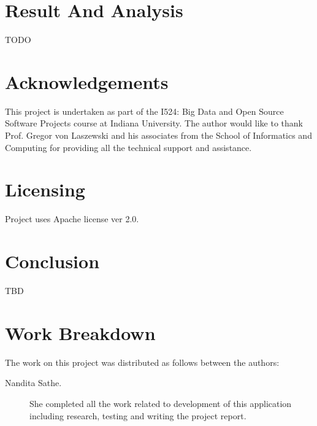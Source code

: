 \documentclass[9pt,twocolumn,twoside]{../../styles/osajnl}
\begin{document}
\section {Result And Analysis}

TODO

\section {Acknowledgements}

This project is undertaken as part of the I524: Big Data and Open Source Software Projects course at Indiana University. The author would like to thank Prof. Gregor von Laszewski and his associates from the School of Informatics and Computing for providing all the technical support and assistance.

\section {Licensing}

Project uses Apache license ver 2.0.

\section {Conclusion}

TBD



 
\newpage

\section{Work Breakdown}

The work on this project was distributed as follows between the
authors:

\begin{description}

\item[Nandita Sathe.] She completed all the work related to development of this application including research, testing and writing the project report. 

\end{description}
\end{document}
